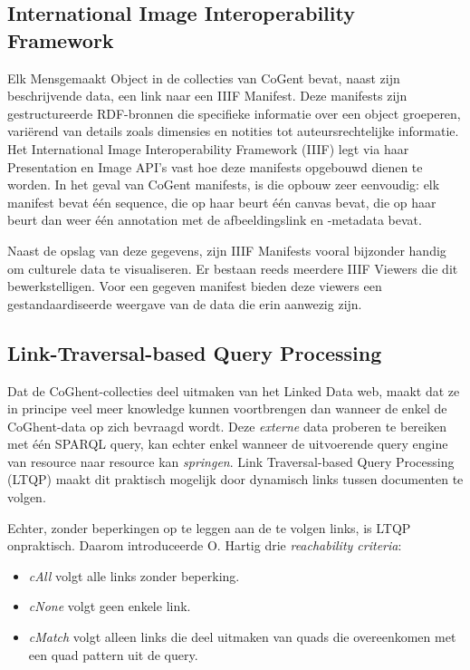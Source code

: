 \documentclass[conference]{IEEEtran}
\begin{document}
\subsection{International Image Interoperability Framework}
Elk Mensgemaakt Object in de collecties van CoGent bevat, naast zijn beschrijvende data, een link naar een IIIF Manifest. Deze manifests zijn gestructureerde RDF-bronnen die specifieke informatie over een object groeperen, variërend van details zoals dimensies en notities tot auteursrechtelijke informatie. Het International Image Interoperability Framework (IIIF) legt via haar Presentation en Image API's vast hoe deze manifests opgebouwd dienen te worden. In het geval van CoGent manifests, is die opbouw zeer eenvoudig: elk manifest bevat één sequence, die op haar beurt één canvas bevat, die op haar beurt dan weer één annotation met de afbeeldingslink en -metadata bevat. \cite{appleby2017presentation} \cite{emanuel2018stitching} \cite{floreverk2022coghent}

Naast de opslag van deze gegevens, zijn IIIF Manifests vooral bijzonder handig om culturele data te visualiseren. Er bestaan reeds meerdere IIIF Viewers die dit bewerkstelligen. Voor een gegeven manifest bieden deze viewers een gestandaardiseerde weergave van de data die erin aanwezig zijn. \cite{snydman2015international}

\subsection{Link-Traversal-based Query Processing}
Dat de CoGhent-collecties deel uitmaken van het Linked Data web, maakt dat ze in principe veel meer knowledge kunnen voortbrengen dan wanneer de enkel de CoGhent-data op zich bevraagd wordt. Deze \textit{externe} data proberen te bereiken met één SPARQL query, kan echter enkel wanneer de uitvoerende query engine van resource naar resource kan \textit{springen}. Link Traversal-based Query Processing (LTQP) maakt dit praktisch mogelijk door dynamisch links tussen documenten te volgen. \cite{taelman2023ltqp}

Echter, zonder beperkingen op te leggen aan de te volgen links, is LTQP onpraktisch. Daarom introduceerde O. Hartig \cite{hartig2012foundations} drie \textit{reachability criteria}: 
\begin{itemize}
    \item \textit{cAll} volgt alle links zonder beperking.
    \item \textit{cNone} volgt geen enkele link.
    \item \textit{cMatch} volgt alleen links die deel uitmaken van quads die overeenkomen met een quad pattern uit de query.
\end{itemize}
\end{document}
